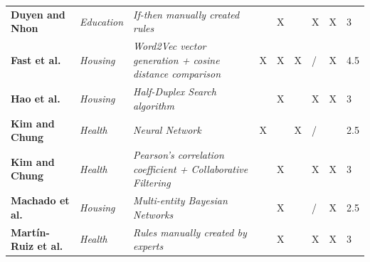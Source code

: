 \begin{table}[H]
\begin{tabular}{C{2.5cm}C{2cm}C{2cm}C{2cm}C{2cm}C{1.5cm}C{1.5cm}C{1.5cm}C{1.5cm}}
\textbf{Duyen and Nhon} \citep{duyenandnhon}      & \textit{Education}                & \textit{If-then manually created rules}                              &                      & X                         &                                 & X                                 & X                        & 3                      \\ 
\textbf{Fast et al.} \citep{fastetal}         & \textit{Housing}                  & \textit{Word2Vec vector generation + cosine distance comparison}     & X                    & X                         & X                               & /                                 & X                        & 4.5                    \\ 
\textbf{Hao et al.} \citep{haoetal}          & \textit{Housing}                  & \textit{Half-Duplex Search algorithm}                                &                      & X                         &                                 & X                                 & X                        & 3                      \\ 
\textbf{Kim and Chung} \citep{kimandchung}       & \textit{Health}                   & \textit{Neural Network}                                              & X                    &                           & X                               & /                                 &                          & 2.5                    \\ 
\textbf{Kim and Chung} \citep{KimandChang}       & \textit{Health}                   & \textit{Pearson's correlation coefficient + Collaborative Filtering} \citep{pearsoncorrelation,collaborativefiltering,collaborativefiltering2} &                      & X                         &                                 & X                                 & X                        & 3                      \\ 
\textbf{Machado et al.} \citep{machadoetal}      & \textit{Housing}                  & \textit{Multi-entity Bayesian Networks} \citep{mebn}                              &                      & X                         &                                 & /                                 & X                        & 2.5                    \\ 
\textbf{Martín-Ruiz et al.} \citep{Martinruizetal}  & \textit{Health}                   & \textit{Rules manually created by experts}                           &                      & X                         &                                 & X                                 & X                        & 3                      \\ 

\end{tabular}
\end{table}
